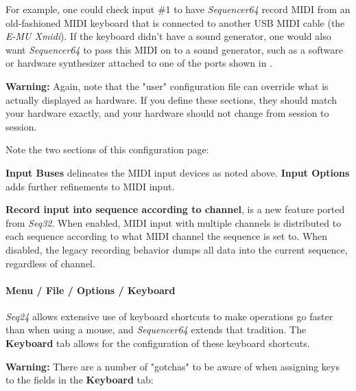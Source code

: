    For example, one could check input \#1 to have \textsl{Sequencer64} record
   MIDI from an old-fashioned MIDI keyboard that is connected to another
   USB MIDI cable (the \textsl{E-MU Xmidi}).  If the keyboard didn't have a
   sound generator, one would also want \textsl{Sequencer64} to pass this MIDI
   on to a sound generator, such as a software or hardware synthesizer attached
   to one of the ports shown in
   .

   \textbf{Warning:}
   Again, note that the "user" configuration file can override what is actually
   displayed as hardware.  If you define these sections, they should match your
   hardware exactly, and your hardware should not change from session to
   session.

   Note the two sections of this configuration page:

   \textbf{Input Buses} delineates the MIDI input devices as noted above.
   \textbf{Input Options} adds further refinements to MIDI input.

   \textbf{Record input into sequence according to channel},
   is a new feature ported from \textsl{Seq32}.
   When enabled, MIDI input with multiple channels is distributed to
   each sequence according to what MIDI channel the sequence is set to.
   When disabled, the legacy recording behavior dumps all data into the current
   sequence, regardless of channel.

\paragraph{Menu / File / Options / Keyboard }
\label{paragraph:seq64_menu_file_options_keyboard}

   \textsl{Seq24} allows extensive use of
   keyboard shortcuts to make operations go faster than when using a mouse,
   and \textsl{Sequencer64} extends that tradition.
   The \textbf{Keyboard} tab allows for the configuration of these keyboard
   shortcuts.

   \textbf{Warning:}
   There are a number of "gotchas" to be aware of when assigning keys to the
   fields in the \textbf{Keyboard} tab:

